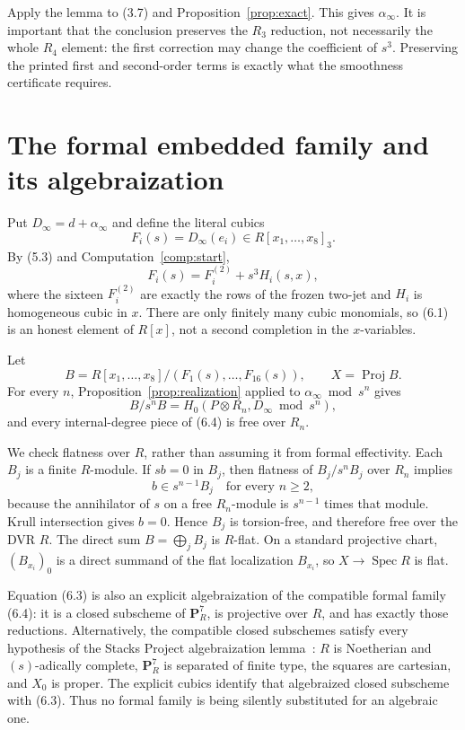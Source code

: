 \documentclass[11pt]{article}
\theoremstyle{definition}
\theoremstyle{remark}
\newcommand{\PP}{\mathbf P}
\newcommand{\Spec}{\operatorname{Spec}}
\newcommand{\Proj}{\operatorname{Proj}}
\begin{document}
Apply the lemma to (3.7) and Proposition~\ref{prop:exact}.  This gives
$\alpha_\infty$.  It is important that the conclusion preserves the
$R_3$ reduction, not necessarily the whole $R_4$ element: the first
correction may change the coefficient of $s^3$.  Preserving the printed
first and second-order terms is exactly what the smoothness certificate
requires.

\section{The formal embedded family and its algebraization}

Put $D_\infty=d+\alpha_\infty$ and define the literal cubics
\[
 F_i(s)=D_\infty(e_i)\in R[x_1,\ldots,x_8]_3.                \tag{6.1}
\]
By (5.3) and Computation~\ref{comp:start},
\[
 F_i(s)=F_i^{(2)}+s^3H_i(s,x),                               \tag{6.2}
\]
where the sixteen $F_i^{(2)}$ are exactly the rows of the frozen two-jet and
$H_i$ is homogeneous cubic in $x$.  There are only finitely many cubic
monomials, so (6.1) is an honest element of $R[x]$, not a second completion
in the $x$-variables.

Let
\[
 B=R[x_1,\ldots,x_8]/(F_1(s),\ldots,F_{16}(s)),
 \qquad X=\Proj B.                                           \tag{6.3}
\]
For every $n$, Proposition~\ref{prop:realization} applied to
$\alpha_\infty\bmod s^n$ gives
\[
 B/s^nB
 =H_0(P\otimes R_n,D_\infty\bmod s^n),                     \tag{6.4}
\]
and every internal-degree piece of (6.4) is free over $R_n$.

We check flatness over $R$, rather than assuming it from formal effectivity.
Each $B_j$ is a finite $R$-module.  If $sb=0$ in $B_j$, then flatness of
$B_j/s^nB_j$ over $R_n$ implies
\[
 b\in s^{n-1}B_j\quad\text{for every }n\geq2,
\]
because the annihilator of $s$ on a free $R_n$-module is $s^{n-1}$ times
that module.  Krull intersection gives $b=0$.  Hence $B_j$ is torsion-free,
and therefore free over the DVR $R$.  The direct sum $B=\bigoplus_jB_j$ is
$R$-flat.  On a standard projective chart, $(B_{x_i})_0$ is a direct summand
of the flat localization $B_{x_i}$, so $X\to\Spec R$ is flat.

Equation (6.3) is also an explicit algebraization of the compatible formal
family (6.4): it is a closed subscheme of $\PP^7_R$, is projective over $R$,
and has exactly those reductions.  Alternatively, the compatible closed
subschemes satisfy every hypothesis of the Stacks Project algebraization
lemma~\cite[Tag 0899]{StacksAlg}: $R$ is Noetherian and $(s)$-adically
complete, $\PP^7_R$ is separated of finite type, the squares are cartesian,
and $X_0$ is proper.  The explicit cubics identify that algebraized closed
subscheme with (6.3).  Thus no formal family is being silently substituted
for an algebraic one.
\end{document}
